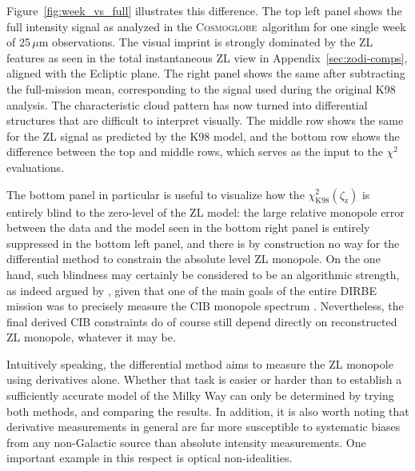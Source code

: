 \documentclass[twocolumn]{aa}
\newcommand{\cosmoglobe}{\textsc{Cosmoglobe}}
\begin{document}
Figure~\ref{fig:week_vs_full} illustrates this difference. The top
left panel shows the full intensity signal as analyzed in the
\cosmoglobe\ algorithm for one single week of 25\,$\mu$m
observations. The visual imprint is strongly dominated by the ZL
features as seen in the total instantaneous ZL view in Appendix~\ref{sec:zodi-comps}, aligned with the Ecliptic
plane. The right panel shows the same after subtracting the
full-mission mean, corresponding to the signal used during 
the original K98 analysis. The characteristic cloud pattern has now turned
into differential structures that are difficult to interpret
visually. The middle row shows the same for the ZL signal as predicted by the K98 model,
and the bottom row shows the difference between the top and middle
rows, which serves as the input to the $\chi^2$ evaluations.

%

The bottom panel in particular is useful to visualize 
how the $\chi^2_{\mathrm{K98}}(\zeta_{\mathrm{z}})$
is entirely blind to the
zero-level of the ZL model: the large relative monopole error between
the data and the model seen in the bottom right panel is entirely
suppressed in the bottom left panel, and there is by construction no
way for the differential method to constrain the absolute level ZL
monopole. On the one hand, such blindness may certainly be considered
to be an algorithmic strength, as indeed argued by
\citet{kelsall1998}, given that one of the main goals of the entire
DIRBE mission was to precisely measure the CIB monopole spectrum
\citep{hauser1998}. Nevertheless, the final derived CIB constraints do
of course still depend directly on reconstructed ZL monopole, whatever
it may be. 

Intuitively speaking, the differential method aims to
measure the ZL monopole using derivatives alone. Whether that task is
easier or harder than to establish a sufficiently accurate model of
the Milky Way can only be determined by trying both methods, and
comparing the results. In addition, it is also worth noting that
derivative measurements in general are far more susceptible to
systematic biases from any non-Galactic source than absolute intensity
measurements. One important example in this respect is optical
non-idealities.
\end{document}
